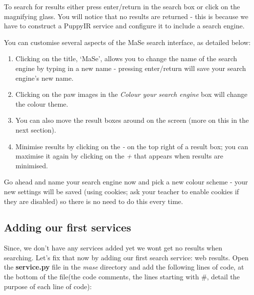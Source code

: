 \documentclass[letterpaper,10pt,english]{sphinxmanual}
\begin{document}
To search for results either press enter/return in the search box or click on the magnifying glass. You will notice that no results are returned - this is because we have to construct a PuppyIR service and configure it to include a search engine.

You can customise several aspects of the MaSe search interface, as detailed below:
\begin{enumerate}
\item {} 
Clicking on the title, `MaSe', allows you to change the name of the search engine by typing in a new name - pressing enter/return will save your search engine's new name.

\item {} 
Clicking on the paw images in the \emph{Colour your search engine} box will change the colour theme.

\item {} 
You can also move the result boxes around on the screen (more on this in the next section).

\item {} 
Minimise results by clicking on the \emph{-} on the top right of a result box; you can maximise it again by clicking on the \emph{+} that appears when results are minimised.

\end{enumerate}

Go ahead and name your search engine now and pick a new colour scheme - your new settings will be saved (using cookies; ask your teacher to enable cookies if they are disabled) so there is no need to do this every time.


\subsection{Adding our first services}
\label{mase-tutorial:adding-our-first-services}
Since, we don't have any services added yet we wont get no results when searching. Let's fix that now by adding our first search service: web results. Open the \textbf{service.py} file in the \emph{mase} directory and add the following lines of code, at the bottom of the file(the code comments, the lines starting with \#, detail the purpose of each line of code):
\end{document}
